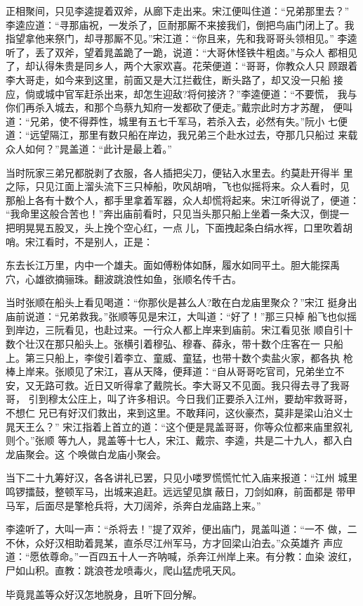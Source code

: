 正相聚间，只见李逵提着双斧，从廊下走出来。宋江便叫住道：“兄弟那里去？”
李逵应道：“寻那庙祝，一发杀了，叵耐那厮不来接我们，倒把鸟庙门闭上了。我
指望拿他来祭门，却寻那厮不见。”宋江道：“你且来，先和我哥哥头领相见。”
李逵听了，丢了双斧，望着晁盖跪了一跪，说道：“大哥休怪铁牛粗卤。”与众人
都相见了，却认得朱贵是同乡人，两个大家欢喜。花荣便道：“哥哥，你教众人只
顾跟着李大哥走，如今来到这里，前面又是大江拦截住，断头路了，却又没一只船
接应，倘或城中官军赶杀出来，却怎生迎敌?将何接济？”李逵便道：“不要慌，
我与你们再杀入城去，和那个鸟蔡九知府一发都砍了便走。”戴宗此时方才苏醒，
便叫道：“兄弟，使不得莽性，城里有五七千军马，若杀入去，必然有失。”阮小
七便道：“远望隔江，那里有数只船在岸边，我兄弟三个赴水过去，夺那几只船过
来载众人如何？”晁盖道：“此计是最上着。”

当时阮家三弟兄都脱剥了衣服，各人插把尖刀，便钻入水里去。约莫赴开得半
里之际，只见江面上溜头流下三只棹船，吹风胡哨，飞也似摇将来。众人看时，见
那船上各有十数个人，都手里拿着军器，众人却慌将起来。宋江听得说了，便道：
“我命里这般合苦也！”奔出庙前看时，只见当头那只船上坐着一条大汉，倒提一
把明晃晃五股叉，头上挽个空心红，一点儿，下面拽起条白绢水裈，口里吹着胡
哨。宋江看时，不是别人，正是：

东去长江万里，内中一个雄夫。面如傅粉体如酥，履水如同平土。胆大能探禹
穴，心雄欲摘骊珠。翻波跳浪性如鱼，张顺名传千古。

当时张顺在船头上看见喝道：“你那伙是甚么人?敢在白龙庙里聚众？”宋江
挺身出庙前说道：“兄弟救我。”张顺等见是宋江，大叫道：“好了！”那三只棹
船飞也似摇到岸边，三阮看见，也赴过来。一行众人都上岸来到庙前。宋江看见张
顺自引十数个壮汉在那只船头上。张横引着穆弘、穆春、薛永，带十数个庄客在一
只船上。第三只船上，李俊引着李立、童威、童猛，也带十数个卖盐火家，都各执
枪棒上岸来。张顺见了宋江，喜从天降，便拜道：“自从哥哥吃官司，兄弟坐立不
安，又无路可救。近日又听得拿了戴院长。李大哥又不见面。我只得去寻了我哥哥，
引到穆太公庄上，叫了许多相识。今日我们正要杀入江州，要劫牢救哥哥，不想仁
兄已有好汉们救出，来到这里。不敢拜问，这伙豪杰，莫非是梁山泊义士晁天王么？”
宋江指着上首立的道：“这个便是晁盖哥哥，你等众位都来庙里叙礼则个。”张顺
等九人，晁盖等十七人，宋江、戴宗、李逵，共是二十九人，都入白龙庙聚会。这
个唤做白龙庙小聚会。

当下二十九筹好汉，各各讲礼已罢，只见小喽罗慌慌忙忙入庙来报道：“江州
城里鸣锣擂鼓，整顿军马，出城来追赶。远远望见旗蔽日，刀剑如麻，前面都是
带甲马军，后面尽是擎枪兵将，大刀阔斧，杀奔白龙庙路上来。”

李逵听了，大叫一声：“杀将去！”提了双斧，便出庙门，晁盖叫道：“一不
做，二不休，众好汉相助着晁某，直杀尽江州军马，方才回梁山泊去。”众英雄齐
声应道：“愿依尊命。”一百四五十人一齐呐喊，杀奔江州岸上来。有分教：血染
波红，尸如山积。直教：跳浪苍龙喷毒火，爬山猛虎吼天风。

毕竟晁盖等众好汉怎地脱身，且听下回分解。